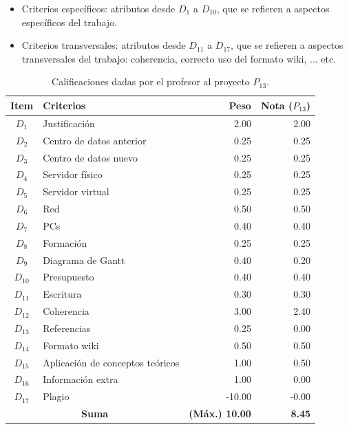 \begin{itemize}
\item Criterios específicos: atributos desde $D_1$ a  $D_{10}$, que se refieren a aspectos específicos del trabajo. 
\item Criterios transversales: atributos desde $D_{11}$ a  $D_{17}$, que se refieren a aspectos transversales del trabajo: coherencia, correcto uso del formato wiki, ... etc.
\end{itemize}

\begin{table}[h]
\centering
\begin{tabular}{|c|l|r|r|}
\hline
\textbf{Item} & \textbf{Criterios}  & \textbf{Peso}  & \textbf{Nota ($P_{13}$) }   \\ \hline
\hline
 $D_1$ & Justificación &  2.00 & 2.00 \\ \hline
 $D_2$ & Centro de datos anterior &   0.25 & 0.25 \\ \hline 
 $D_3$ & Centro de datos nuevo &    0.25 & 0.25 \\ \hline 
 $D_4$ & Servidor físico &    0.25 & 0.25  \\ \hline
 $D_5$ & Servidor virtual &    0.25 & 0.25  \\ \hline 
 $D_6$ & Red &    0.50 & 0.50  \\ \hline 
 $D_7$ & PCs &  0.40 & 0.40  \\ \hline 
 $D_8$ & Formación &    0.25 & 0.25  \\ \hline 
 $D_9$ & Diagrama de Gantt &    0.40  & 0.20  \\ \hline
 $D_{10}$ & Presupuesto &   0.40  & 0.40 \\ \hline
 $D_{11}$ & Escritura &   0.30  & 0.30 \\ \hline
 $D_{12}$ & Coherencia &   3.00  & 2.40 \\ \hline
 $D_{13}$ & Referencias &    0.25  & 0.00 \\ \hline
 $D_{14}$ & Formato wiki &    0.50  & 0.50 \\ \hline
 $D_{15}$ & Aplicación de conceptos teóricos &    1.00  & 0.50 \\ \hline
 $D_{16}$ & Información extra &    1.00  & 0.00 \\ \hline
 $D_{17}$ & Plagio &    -10.00  & -0.00 \\ \hline
 \hline
 \multicolumn{2}{|c|}{\textbf{Suma}} & \textbf{(Máx.) 10.00} & \textbf{8.45} \\ \hline
\end{tabular}
\caption{Calificaciones dadas por el profesor al proyecto $P_{13}$.}
\label{table:project-rubric-supervisor}
\end{table}


